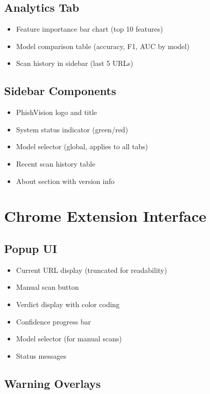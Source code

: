 \documentclass[12pt,a4paper]{report}
\begin{document}
\subsection{Analytics Tab}
\begin{itemize}[leftmargin=*]
    \item Feature importance bar chart (top 10 features)
    \item Model comparison table (accuracy, F1, AUC by model)
    \item Scan history in sidebar (last 5 URLs)
\end{itemize}

\subsection{Sidebar Components}
\begin{itemize}[leftmargin=*]
    \item PhishVision logo and title
    \item System status indicator (green/red)
    \item Model selector (global, applies to all tabs)
    \item Recent scan history table
    \item About section with version info
\end{itemize}

\section{Chrome Extension Interface}

\subsection{Popup UI}
\begin{itemize}[leftmargin=*]
    \item Current URL display (truncated for readability)
    \item Manual scan button
    \item Verdict display with color coding
    \item Confidence progress bar
    \item Model selector (for manual scans)
    \item Status messages
\end{itemize}

\subsection{Warning Overlays}
\end{document}
